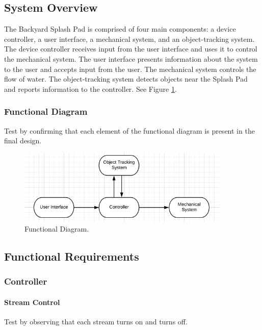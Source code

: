 \subsection{System Overview} 
The Backyard Splash Pad is comprised of four main components: a device controller, a user interface, a mechanical system, and an object-tracking system. 
The device controller receives input from the user interface and uses it to control the mechanical system.
The user interface presents information about the system to the user and accepts input from the user.
The mechanical system controls the flow of water. 
The object-tracking system detects objects near the Splash Pad and reports information to the controller. 
See Figure \ref{fig:functional_diagram_}.

\subsubsection{Functional Diagram}
Test by confirming that each element of the functional diagram is present in the final design. 

\begin{figure}[h]
\centering
\includegraphics[width=0.9\textwidth]{Functional_Diagram.png}
\caption{\label{fig:functional_diagram_}Functional Diagram.}
\end{figure}

\subsection{Functional Requirements}

\subsubsection{Controller}

\paragraph{Stream Control}
Test by observing that each stream turns on and turns off.

